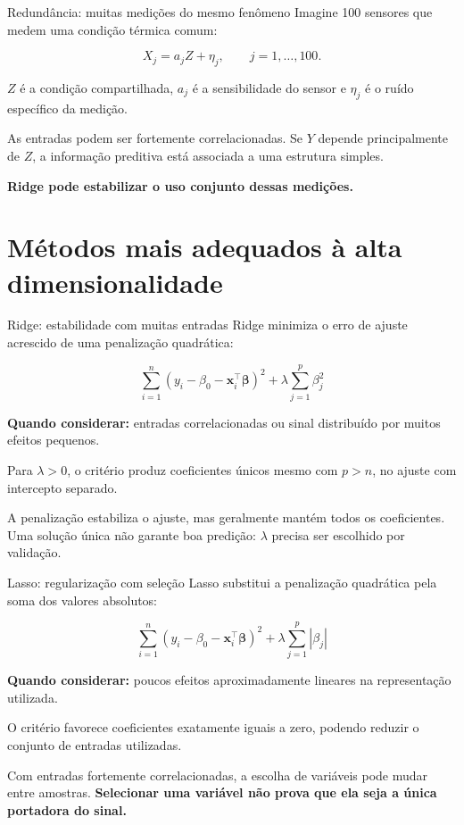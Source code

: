 \documentclass[
  10pt,
  ignorenonframetext,
  aspectratio=169,
  brazilian,
]{beamer}
\begin{document}
\begin{frame}{Redundância: muitas medições do mesmo fenômeno}
\protect{}\label{redunduxe2ncia-muitas-mediuxe7uxf5es-do-mesmo-fenuxf4meno}
Imagine 100 sensores que medem uma condição térmica comum:

\[
X_j=a_jZ+\eta_j,\qquad j=1,\ldots,100.
\]

\(Z\) é a condição compartilhada, \(a_j\) é a sensibilidade do sensor e
\(\eta_j\) é o ruído específico da medição.

As entradas podem ser fortemente correlacionadas. Se \(Y\) depende
principalmente de \(Z\), a informação preditiva está associada a uma
estrutura simples.

\textbf{Ridge pode estabilizar o uso conjunto dessas medições.}
\end{frame}

\section{Métodos mais adequados à alta
dimensionalidade}\label{muxe9todos-mais-adequados-uxe0-alta-dimensionalidade}

\begin{frame}{Ridge: estabilidade com muitas entradas}
\protect{}\label{ridge-estabilidade-com-muitas-entradas}
Ridge minimiza o erro de ajuste acrescido de uma penalização quadrática:

\[
\sum_{i=1}^{n}(y_i-\beta_0-\mathbf x_i^\top\boldsymbol\beta)^2
+\lambda\sum_{j=1}^{p}\beta_j^2
\]

\textbf{Quando considerar:} entradas correlacionadas ou sinal
distribuído por muitos efeitos pequenos.

Para \(\lambda>0\), o critério produz coeficientes únicos mesmo com
\(p>n\), no ajuste com intercepto separado.

A penalização estabiliza o ajuste, mas geralmente mantém todos os
coeficientes. Uma solução única não garante boa predição: \(\lambda\)
precisa ser escolhido por validação.
\end{frame}

\begin{frame}{Lasso: regularização com seleção}
\protect{}\label{lasso-regularizauxe7uxe3o-com-seleuxe7uxe3o}
Lasso substitui a penalização quadrática pela soma dos valores
absolutos:

\[
\sum_{i=1}^{n}(y_i-\beta_0-\mathbf x_i^\top\boldsymbol\beta)^2
+\lambda\sum_{j=1}^{p}|\beta_j|
\]

\textbf{Quando considerar:} poucos efeitos aproximadamente lineares na
representação utilizada.

O critério favorece coeficientes exatamente iguais a zero, podendo
reduzir o conjunto de entradas utilizadas.

Com entradas fortemente correlacionadas, a escolha de variáveis pode
mudar entre amostras. \textbf{Selecionar uma variável não prova que ela
seja a única portadora do sinal.}
\end{frame}
\end{document}
